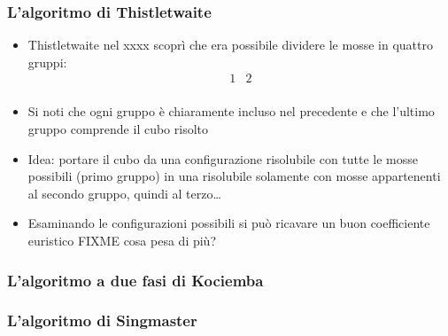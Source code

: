 \documentclass{beamer}
\begin{document}
\begin{frame}
\frametitle{L'algoritmo di Thistletwaite}
\begin{itemize}
\item Thistletwaite nel xxxx scoprì che era possibile dividere le mosse in
quattro gruppi:
\begin{align*}
1 & 2 \\
\end{align*}
\item Si noti che ogni gruppo è chiaramente incluso nel precedente e che 
l'ultimo gruppo comprende il cubo risolto
\item Idea: portare il cubo da una configurazione risolubile con tutte le mosse 
possibili (primo gruppo) in una risolubile solamente con mosse appartenenti al
secondo gruppo, quindi al terzo\dots
\item Esaminando le configurazioni possibili si può ricavare un buon 
coefficiente euristico FIXME cosa pesa di più?
\end{itemize}
\end{frame}

\begin{frame}
\frametitle{L'algoritmo a due fasi di Kociemba}
\end{frame}

\begin{frame}
\frametitle{L'algoritmo di Singmaster}
\end{frame}
\end{document}
